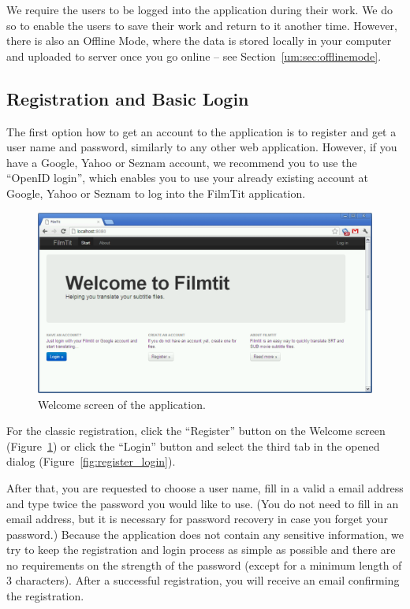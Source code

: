 We require the users to be logged into the application during their work. We do so to enable the users to save their work and return to it another time. However, there is also an Offline Mode, where the data is stored locally in your computer and uploaded to server once you go online -- see Section~\ref{um:sec:offlinemode}.

\subsection{Registration and Basic Login}

The first option how to get an account to the application is to register and get a user name and password, similarly to any other web application. However, if you have a Google, Yahoo or Seznam account, we recommend you to use the ``OpenID login'', which enables you to use your already existing account at Google, Yahoo or Seznam to log into the FilmTit application.

\begin{figure}[h]
\begin{center}
\includegraphics[scale=0.4]{figures/user_manual/welcome_screen.png}
\end{center}
\caption{Welcome screen of the application.}
\label{fig:welcome}
\end{figure}

For the classic registration, click the ``Register'' button on the Welcome screen (Figure~\ref{fig:welcome}) or click the ``Login'' button and select the third tab in the opened dialog (Figure~\ref{fig:register_login}).

After that, you are requested to choose a user name, fill in a valid a email address and type twice the password you would like to use. (You do not need to fill in an email address, but it is necessary for password recovery in case you forget your password.) Because the application does not contain any sensitive information, we try to keep the registration and login process as simple as possible and there are no requirements on the strength of the password (except for a minimum length of 3 characters). After a successful registration, you will receive an email confirming the registration.

